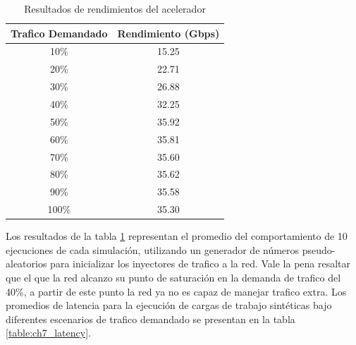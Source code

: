 \begin{table}[]
\centering
\begin{tabular}{cc}
\hline
\rowcolor[HTML]{343434} 
{\color[HTML]{FFFFFF} Trafico Demandado} & {\color[HTML]{FFFFFF} Rendimiento (Gbps)} \\ \hline
10\%                                     & 15.25                                     \\
\rowcolor[HTML]{EFEFEF} 
20\%                                     & 22.71                                     \\
30\%                                     & 26.88                                     \\
\rowcolor[HTML]{EFEFEF} 
40\%                                     & 32.25                                     \\ \hline
50\%                                     & 35.92                                     \\
\rowcolor[HTML]{EFEFEF} 
60\%                                     & 35.81                                     \\
70\%                                     & 35.60                                     \\
\rowcolor[HTML]{EFEFEF} 
80\%                                     & 35.62                                     \\
90\%                                     & 35.58                                     \\
\rowcolor[HTML]{EFEFEF} 
100\%                                    & 35.30                                    
\end{tabular}
	\caption{Resultados de rendimientos del acelerador}
	\label{table:ch7_throughtput}
\end{table}


Los resultados de la tabla \ref{table:ch7_throughtput} representan el promedio del comportamiento de 10 ejecuciones de cada simulación, utilizando un generador de números pseudo-aleatorios para inicializar los inyectores de trafico a la red. Vale la pena resaltar que el que la red alcanzo su punto de saturación en la demanda de trafico del 40\%, a partir de este punto la red ya no es capaz de manejar trafico extra. Los promedios de latencia para la ejecución de cargas de trabajo sintéticas bajo diferentes escenarios de trafico demandado se presentan en la tabla \ref{table:ch7_latency}.

